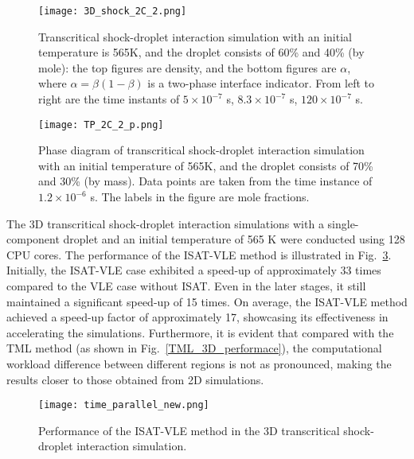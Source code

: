 \begin{figure}[htbp]
\centering
\texttt{[image: 3D\_shock\_2C\_2.png]}
\caption{Transcritical shock-droplet interaction simulation with an initial temperature is 565K, and the droplet consists of 60\% and 40\% (by mole): the top figures are density, and the bottom figures are $\alpha$, where $\alpha = \beta (1-\beta)$ is a two-phase interface indicator. From left to right are the time instants of $5\times 10^{-7}$ s, $8.3\times 10^{-7}$ s, $120\times 10^{-7}$ s.}
\label{droplet_3d_2C} 
\end{figure}

\begin{figure}[htbp]
\centering
\texttt{[image: TP\_2C\_2\_p.png]}
\caption{Phase diagram of transcritical shock-droplet interaction simulation with an initial temperature of 565K, and the droplet consists of 70\% and 30\% (by mass). Data points are taken from the time instance of $1.2\times 10^{-6}$ s. The labels in the figure are mole fractions.}
\label{droplet_3D_2C_phasediagram} 
\end{figure}

The 3D transcritical shock-droplet interaction simulations with a single-component droplet and an initial temperature of 565 K were conducted using 128 CPU cores. The performance of the ISAT-VLE method is illustrated in Fig.~\ref{droplet_3D_perf}. Initially, the ISAT-VLE case exhibited a speed-up of approximately 33 times compared to the VLE case without ISAT. Even in the later stages, it still maintained a significant speed-up of 15 times. On average, the ISAT-VLE method achieved a speed-up factor of approximately 17, showcasing its effectiveness in accelerating the simulations. Furthermore, it is evident that compared with the TML method (as shown in Fig.~\ref{TML_3D_performace}), the computational workload difference between different regions is not as pronounced, making the results closer to those obtained from 2D simulations.


 





\begin{figure}[htbp]
\centering
\texttt{[image: time\_parallel\_new.png]}
\caption{Performance of the ISAT-VLE method in the 3D transcritical shock-droplet interaction simulation.}
\label{droplet_3D_perf} 
\end{figure}




